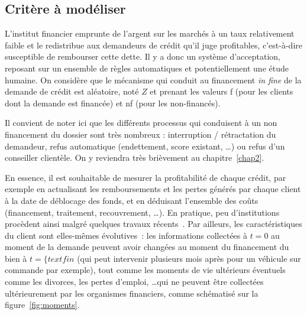 \subsection{Critère à modéliser} \label{subsec:critere}

L'institut financier emprunte de l'argent sur les marchés à un taux relativement faible et le redistribue aux demandeurs de crédit qu'il juge profitables, c'est-à-dire susceptible de rembourser cette dette. Il y a donc un système d'acceptation, reposant sur un ensemble de règles automatiques et potentiellement une étude humaine. On considère que le mécanisme qui conduit au financement \textit{in fine} de la demande de crédit est aléatoire, noté $Z$ et prenant les valeurs f (pour les clients dont la demande est financée) et nf (pour les non-financés).

Il convient de noter ici que les différents processus qui conduisent à un non financement du dossier sont très nombreux : interruption / rétractation du demandeur, refus automatique (endettement, \gls{score} existant, \dots) ou refus d'un conseiller clientèle. On y reviendra très brièvement au chapitre~\ref{chap2}.

En essence, il est souhaitable de mesurer la profitabilité de chaque crédit, par exemple en actualisant les remboursements et les pertes générés par chaque client à la date de déblocage des fonds, et en déduisant l'ensemble des coûts (financement, traitement, recouvrement, \dots). En pratique, peu d'institutions procèdent ainsi malgré quelques travaux récents~\cite{finlay2010credit}. Par ailleurs, les caractéristiques du client sont elles-mêmes évolutives~: les informations collectées à $t=0$ au moment de la demande peuvent avoir changées au moment du financement du bien à $t = \{text{fin}$ (qui peut intervenir plusieurs mois après pour un véhicule sur commande par exemple), tout comme les moments de vie ultérieurs éventuels comme les divorces, les pertes d'emploi, \dots qui ne peuvent être collectées ultérieurement par les organismes financiers, comme schématisé sur la figure~\ref{fig:moments}.

